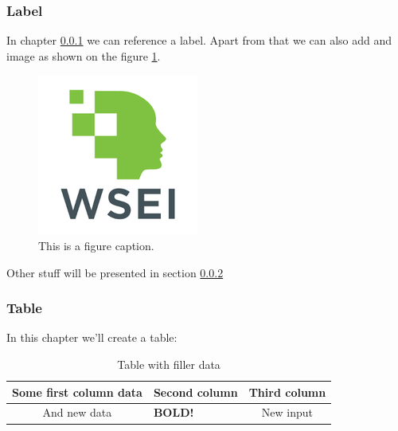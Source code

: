 \subsubsection{Label}
\label{label:label_title} %

In chapter \ref{label:label_title} we can reference a label. Apart from that we can also add and image as shown on the figure \ref{fig:example_figure}.
    
\begin{figure}[h] %
    \centering
    \includegraphics[scale=0.7]{Images/WSEI-Logo.png} %
    \caption[Short text]{This is a figure caption.} %
    \label{fig:example_figure} %
\end{figure}

Other stuff will be presented in section \ref{label:table_title}

\subsubsection{Table}
\label{label:table_title}

In this chapter we'll create a table:
\begin{table}[h] %
    \centering
    \begin{tabular}{|c|l||c|} %
        \hline %
        Some first column data & Second column & Third column \\ \hline \hline
        And new data & \textbf{BOLD!} & New input \\ %
        \hline
    \end{tabular}
    \caption[First table.]{Table with filler data} %
    \label{tab:first_table} %
\end{table}

